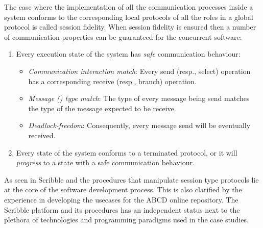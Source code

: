 
The case where the implementation of all the communication
processes inside a system conforms to the corresponding
local protocols of all the roles in a global protocol 
is called session fidelity. When session fidelity is
ensured
then a number of communication properties can be guaranteed
for the concurrent software:
%
\begin{enumerate}[label=$\bullet$]
	\item	Every execution state of the system has {\em safe} communication behaviour:
	\begin{itemize}
		\item	{\em Communication interaction match}: Every send (resp., select) operation has a corresponding receive (resp., branch) operation.
		\item	{\em Message () type match}: The type of every message being send matches the type of the message expected to be receive.
		\item	{\em Deadlock-freedom}: Consequently, every message send will be eventually received.
	\end{itemize}
	
	\item	Every state of the system conforms to a terminated protocol, or
			it will {\em progress} to a state with a safe communication behaviour.
\end{enumerate}

As seen in  Scribble and the procedures
that manipulate session type protocols lie at the core
of the software development process. This is also clarified
by the experience in developing the usecases for the ABCD
online repository. The Scribble platform and its procedures
has an independent status next to the plethora of technologies and
programming paradigms used in the case studies.

%


